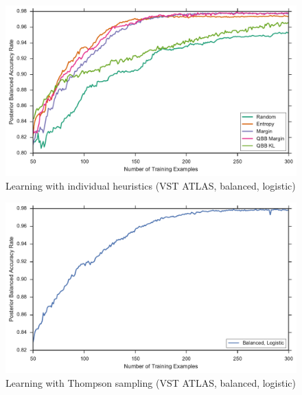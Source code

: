 \begin{figure}[p]
	\centering
	\includegraphics[width=\textwidth]{figures/5_active/vstatlas_bl_individuals}
	\caption[Learning with individual heuristics (VST ATLAS, balanced, logistic)]{
		Learning with individual heuristics (VST ATLAS, balanced, logistic)}
	\label{fig:vstatlas_bl_individuals}
\end{figure}

\begin{figure}[p]
	\centering
	\includegraphics[width=\textwidth]{figures/5_thompson/vstatlas_bl_thompson}
	\caption[Learning with Thompson sampling (VST ATLAS, balanced, logistic)]{
		Learning with Thompson sampling (VST ATLAS, balanced, logistic)}
	\label{fig:vstatlas_bl_thompson}
\end{figure}

